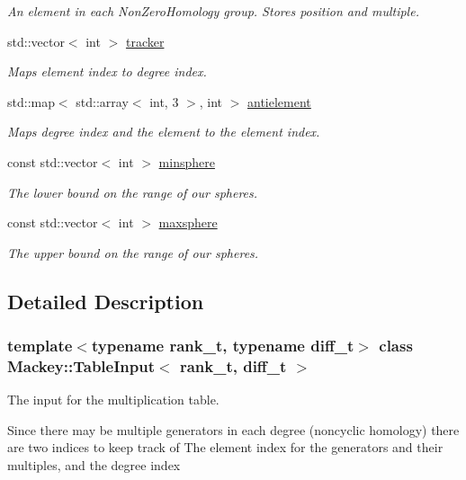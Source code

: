 \begin{DoxyCompactItemize}
\begin{DoxyCompactList}\small\item\em An element in each Non\+Zero\+Homology group. Stores position and multiple. \end{DoxyCompactList}\item 
std\+::vector$<$ int $>$ \hyperlink{classMackey_1_1TableInput_a33fcb835c85458360bb78cf07555fb60}{tracker}
\begin{DoxyCompactList}\small\item\em Maps element index to degree index. \end{DoxyCompactList}\item 
std\+::map$<$ std\+::array$<$ int, 3 $>$, int $>$ \hyperlink{classMackey_1_1TableInput_ad37f09ab6d0bfdab5d55537145b916ed}{antielement}
\begin{DoxyCompactList}\small\item\em Maps degree index and the element to the element index. \end{DoxyCompactList}\item 
const std\+::vector$<$ int $>$ \hyperlink{classMackey_1_1TableInput_a3f4bf3973cebe4bc2d305d111fa8b478}{minsphere}
\begin{DoxyCompactList}\small\item\em The lower bound on the range of our spheres. \end{DoxyCompactList}\item 
const std\+::vector$<$ int $>$ \hyperlink{classMackey_1_1TableInput_a56448ebdfecb95da4c52349d4ccbf576}{maxsphere}
\begin{DoxyCompactList}\small\item\em The upper bound on the range of our spheres. \end{DoxyCompactList}\end{DoxyCompactItemize}


\subsection{Detailed Description}
\subsubsection*{template$<$typename rank\+\_\+t, typename diff\+\_\+t$>$\newline
class Mackey\+::\+Table\+Input$<$ rank\+\_\+t, diff\+\_\+t $>$}

The input for the multiplication table. 

Since there may be multiple generators in each degree (noncyclic homology) there are two indices to keep track of The element index for the generators and their multiples, and the degree index 

